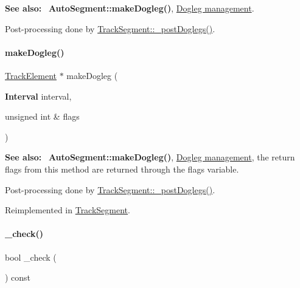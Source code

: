 {\bfseries See also\+:}~ \textbf{ Auto\+Segment\+::make\+Dogleg()}, \hyperlink{classKite_1_1TrackSegment_secDogleg}{Dogleg management}.

Post-\/processing done by \hyperlink{classKite_1_1TrackSegment_a10a45c049d0bd7d01c7eff1c5441c7a2}{Track\+Segment\+::\+\_\+post\+Doglegs()}. \mbox{\label{classKite_1_1TrackElement_a524f1569b2f2c1a84df2fe47e84e28ed}} 
\paragraph{\texorpdfstring{make\+Dogleg()}{makeDogleg()}\hspace{0.1cm}{\footnotesize\ttfamily [3/3]}}
{\footnotesize\ttfamily \hyperlink{classKite_1_1TrackElement}{Track\+Element} $\ast$ make\+Dogleg (\begin{DoxyParamCaption}\item[{\textbf{ Interval}}]{interval,  }\item[{unsigned int \&}]{flags }\end{DoxyParamCaption})\hspace{0.3cm}{\ttfamily [virtual]}}

{\bfseries See also\+:}~ \textbf{ Auto\+Segment\+::make\+Dogleg()}, \hyperlink{classKite_1_1TrackSegment_secDogleg}{Dogleg management}, the return flags from this method are returned through the {\ttfamily flags} variable.

Post-\/processing done by \hyperlink{classKite_1_1TrackSegment_a10a45c049d0bd7d01c7eff1c5441c7a2}{Track\+Segment\+::\+\_\+post\+Doglegs()}. 

Reimplemented in \hyperlink{classKite_1_1TrackSegment_a524f1569b2f2c1a84df2fe47e84e28ed}{Track\+Segment}.

\mbox{\label{classKite_1_1TrackElement_ad79f4c6ea0fe1135b8264a29af085909}} 
\paragraph{\texorpdfstring{\+\_\+check()}{\_check()}}
{\footnotesize\ttfamily bool \+\_\+check (\begin{DoxyParamCaption}{ }\end{DoxyParamCaption}) const\hspace{0.3cm}{\ttfamily [virtual]}}

